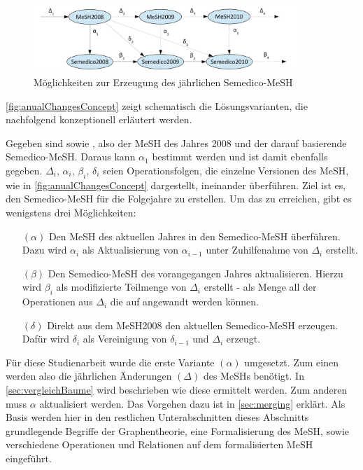 
\begin{figure}
\begin{center}
\includegraphics[width=0.9\textwidth]{figs/anualChangesConcepts.pdf}
\end{center}
\caption{Möglichkeiten zur Erzeugung des jährlichen Semedico-MeSH}
\label{fig:anualChangesConcept}
\end{figure}

\autoref{fig:anualChangesConcept} zeigt schematisch die Lösungsvarianten, die nachfolgend konzeptionell erläutert werden. \par

Gegeben sind  sowie , also der MeSH des Jahres 2008 und der darauf basierende Semedico-MeSH. Daraus kann $\alpha_1$ bestimmt werden und ist damit ebenfalls gegeben. $\Delta_i$, $\alpha_i$, $\beta_i$, $\delta_i$ seien Operationsfolgen, die einzelne Versionen des MeSH, wie in \autoref{fig:anualChangesConcept} dargestellt, ineinander überführen. Ziel ist es, den Semedico-MeSH für die Folgejahre zu erstellen. Um das zu erreichen, gibt es wenigstens drei Möglichkeiten:
\begin{itemize}
  \item[$(\alpha)$] Den MeSH des aktuellen Jahres in den Semedico-MeSH überführen. Dazu wird $\alpha_i$ als Aktualisierung von $\alpha_{i-1}$ unter Zuhilfenahme von $\Delta_i$ erstellt.
  \item[$(\beta)$] Den Semedico-MeSH des vorangegangen Jahres aktualisieren. Hierzu wird $\beta_i$ als modifizierte Teilmenge von $\Delta_i$ erstellt - als Menge all der Operationen aus $\Delta_i$ die auf  angewandt werden können. 
  \item[$(\delta)$] Direkt aus dem MeSH2008 den aktuellen Semedico-MeSH erzeugen. Dafür wird $\delta_i$ als Vereinigung von $\delta_{i-1}$ und $\Delta_i$ erzeugt.
\end{itemize}

Für diese Studienarbeit wurde die erste Variante $(\alpha)$ umgesetzt. Zum einen werden also die jährlichen Änderungen $(\Delta)$ des MeSHs benötigt. In \autoref{sec:vergleichBaume} \textit{} wird beschrieben wie diese ermittelt werden. Zum anderen muss $\alpha$ aktualisiert werden. Das Vorgehen dazu ist in \autoref{sec:merging} \textit{} erklärt. Als Basis werden hier in den restlichen Unterabschnitten dieses Abschnitts grundlegende Begriffe der Graphentheorie, eine Formalisierung des MeSH, sowie verschiedene Operationen und Relationen auf dem formalisierten MeSH eingeführt.


